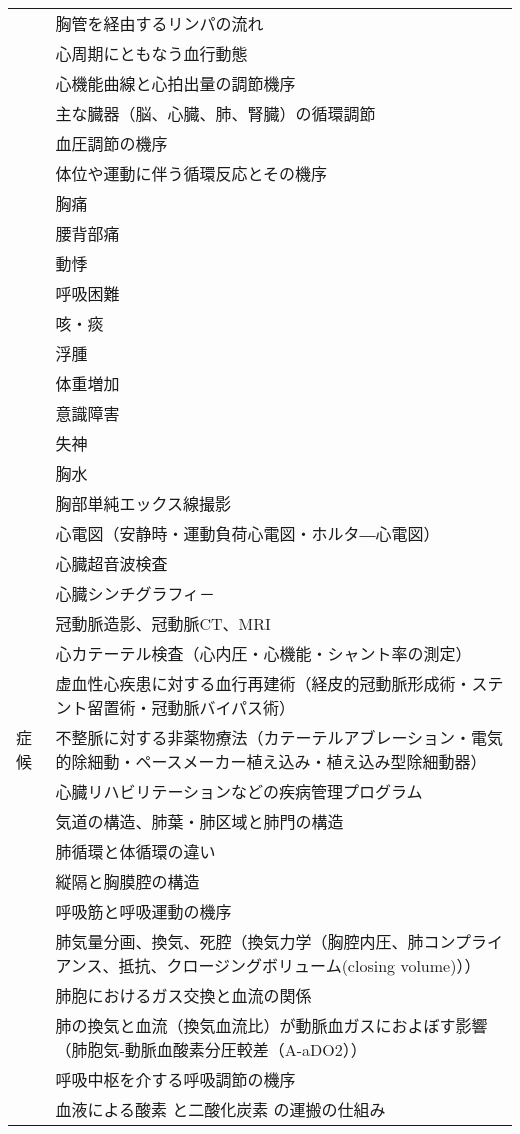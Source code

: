 \begin{xltabular}{\linewidth}{XX}
 & 胸管を経由するリンパの流れ \\
 & 心周期にともなう血行動態 \\
 & 心機能曲線と心拍出量の調節機序 \\
 & 主な臓器（脳、心臓、肺、腎臓）の循環調節 \\
 & 血圧調節の機序 \\
 & 体位や運動に伴う循環反応とその機序 \\
 & 胸痛 \\
 & 腰背部痛 \\
 & 動悸 \\
 & 呼吸困難 \\
 & 咳・痰 \\
 & 浮腫 \\
 & 体重増加 \\
 & 意識障害 \\
 & 失神 \\
 & 胸水 \\
 & 胸部単純エックス線撮影 \\
 & 心電図（安静時・運動負荷心電図・ホルタ―心電図） \\
 & 心臓超音波検査 \\
 & 心臓シンチグラフィ－ \\
 & 冠動脈造影、冠動脈CT、MRI \\
 & 心カテーテル検査（心内圧・心機能・シャント率の測定） \\
 & 虚血性心疾患に対する血行再建術（経皮的冠動脈形成術・ステント留置術・冠動脈バイパス術） \\
症候 & 不整脈に対する非薬物療法（カテーテルアブレーション・電気的除細動・ペースメーカー植え込み・植え込み型除細動器） \\
 & 心臓リハビリテーションなどの疾病管理プログラム \\
 & 気道の構造、肺葉・肺区域と肺門の構造 \\
 & 肺循環と体循環の違い \\
 & 縦隔と胸膜腔の構造 \\
 & 呼吸筋と呼吸運動の機序 \\
 & 肺気量分画、換気、死腔（換気力学（胸腔内圧、肺コンプライアンス、抵抗、クロージングボリューム(closing volume)）） \\
 & 肺胞におけるガス交換と血流の関係 \\
 & 肺の換気と血流（換気血流比）が動脈血ガスにおよぼす影響（肺胞気-動脈血酸素分圧較差（A-aDO2）） \\
 & 呼吸中枢を介する呼吸調節の機序 \\
 & 血液による酸素 と二酸化炭素 の運搬の仕組み \\

\end{xltabular}
